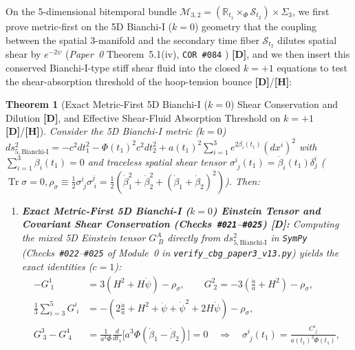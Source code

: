 \documentclass[11pt,a4paper]{article}
\newcommand{\catD}{\textbf{\textcolor{blue!75!black}{[D]}}}
\newcommand{\catH}{\textbf{\textcolor{orange!85!black}{[H]}}}
\theoremstyle{plain}
\newtheorem{theorem}{Theorem}[section]
\theoremstyle{definition}
\theoremstyle{remark}
\numberwithin{equation}{section}
\begin{document}
On the 5-dimensional bitemporal bundle $\mathcal{M}_{3,2} = (\mathbb{R}_{t_1} \times_{\Phi} \mathcal{S}_{t_2}) \times \Sigma_3$, we first prove metric-first on the 5D Bianchi-I ($k = 0$) geometry that the coupling between the spatial 3-manifold and the secondary time fiber $\mathcal{S}_{t_2}$ dilutes spatial shear by $e^{-2\psi}$ (\textit{Paper~0} Theorem~5.1(iv), \texttt{COR \#084} \cite{jimenez2026_p0}) \catD, and we then insert this conserved Bianchi-I-type stiff shear fluid into the closed $k = +1$ equations to test the shear-absorption threshold of the hoop-tension bounce \catD/\catH:

\begin{theorem}[Exact Metric-First 5D Bianchi-I ($k = 0$) Shear Conservation and Dilution \catD, and Effective Shear-Fluid Absorption Threshold on $k = +1$ \catD/\catH]
\label{thm:bkl_shear_suppression}
Consider the 5D Bianchi-I metric ($k = 0$) $ds_{5,\text{Bianchi-I}}^2 = -c^2 dt_1^2 - \Phi(t_1)^2 c^2 dt_2^2 + a(t_1)^2 \sum_{i=1}^3 e^{2\beta_i(t_1)}(dx^i)^2$ with $\sum_{i=1}^3 \beta_i(t_1) = 0$ and traceless spatial shear tensor $\sigma^i_{\;j}(t_1) = \dot{\beta}_i(t_1)\delta^i_j$ ($\operatorname{Tr}\sigma = 0, \rho_{\sigma} \equiv \frac{1}{2}\sigma^i_{\;j}\sigma^j_{\;i} = \frac{1}{2}(\dot{\beta}_1^2 + \dot{\beta}_2^2 + (\dot{\beta}_1 + \dot{\beta}_2)^2)$). Then:
\begin{enumerate}
    \item[\textnormal{(i)}] \textbf{Exact Metric-First 5D Bianchi-I ($k = 0$) Einstein Tensor and Covariant Shear Conservation (Checks~\texttt{\#021}--\texttt{\#025}) \catD:} Computing the mixed 5D Einstein tensor $G^A_{\;B}$ directly from $ds_{5,\text{Bianchi-I}}^2$ in \texttt{SymPy} (Checks~\texttt{\#022}--\texttt{\#025} of Module~0 in \allowbreak\texttt{verify\_cbg\_paper3\_v13.py}) yields the exact identities ($c = 1$):
    \begin{align}
      -G^1_{\;1} &= 3\left(H^2 + H\dot{\psi}\right) - \rho_{\sigma}, \qquad G^2_{\;2} = -3\left(\frac{\ddot{a}}{a} + H^2\right) - \rho_{\sigma}, \nonumber \\[3pt]
      \frac{1}{3}\sum_{i=3}^5 G^i_{\;i} &= -\left(2\frac{\ddot{a}}{a} + H^2 + \ddot{\psi} + \dot{\psi}^2 + 2H\dot{\psi}\right) - \rho_{\sigma}, \nonumber \\[3pt]
      G^3_{\;3} - G^4_{\;4} &= \frac{1}{a^3\Phi}\frac{d}{dt_1}\!\Big[a^3\Phi\left(\dot{\beta}_1 - \dot{\beta}_2\right)\Big] = 0 \quad \Longrightarrow \quad \sigma^i_{\;j}(t_1) = \frac{C^i_{\;j}}{a(t_1)^3 \Phi(t_1)},
      \label{eq:5d_shear_conservation}
    \end{align}

\end{enumerate}
\end{theorem}
\end{document}

